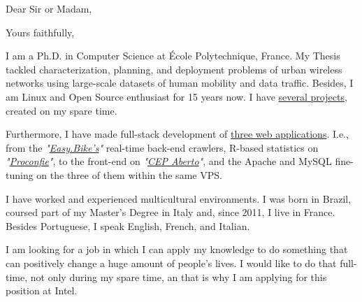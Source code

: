 \date{\today}
\opening{Dear Sir or Madam,}
\closing{Yours faithfully,}
\makelettertitle

I am a Ph.D. in Computer Science at École Polytechnique, France. My Thesis tackled characterization, planning, and deployment problems of urban wireless networks using large-scale datasets of human mobility and data traffic. Besides, I am Linux and Open Source enthusiast for 15 years now. I have \hyperref[sec:open_source]{several projects}, created on my spare time.

Furthermore, I have made full-stack development of \hyperref[sec:web_app]{three web applications}. I.e., from the \textit{"\href{http://easy.bike}{Easy.Bike's}"} real-time back-end crawlers, R-based statistics on \textit{"\href{http://www.proconfie.com}{Proconfie}"}, to the front-end on \textit{"\href{http://www.cepaberto.com}{CEP Aberto}"}, and the Apache and MySQL fine-tuning on the three of them within the same VPS.


I have worked and experienced multicultural environments. I was born in Brazil, coursed part of my Master's Degree in Italy and, since 2011, I live in France. Besides Portuguese, I speak English, French, and Italian.

I am looking for a job in which I can apply my knowledge to do something that can positively change a huge amount of people's lives. I would like to do that full-time, not only during my spare time, an that is why I am applying for this position at Intel.

\makeletterclosing